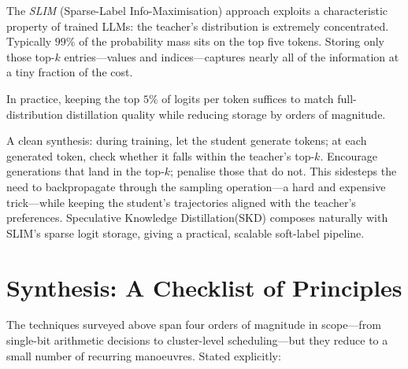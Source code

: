 \documentclass[11pt,a4paper]{article}
\theoremstyle{definition}
\theoremstyle{remark}
\theoremstyle{plain}
\begin{document}
The \emph{SLIM} (Sparse-Label Info-Maximisation) approach exploits a
characteristic property of trained LLMs: the teacher's distribution is
extremely concentrated. Typically $99\%$ of the probability mass sits on
the top five tokens. Storing only those top-$k$ entries---values and
indices---captures nearly all of the information at a tiny fraction of the
cost.

In practice, keeping the top $5\%$ of logits per token suffices to match
full-distribution distillation quality while reducing storage by orders of
magnitude.

A clean synthesis: during training, let the student generate tokens; at
each generated token, check whether it falls within the teacher's top-$k$.
Encourage generations that land in the top-$k$; penalise those that do
not. This sidesteps the need to backpropagate through the sampling
operation---a hard and expensive trick---while keeping the student's
trajectories aligned with the teacher's preferences. Speculative Knowledge Distillation(SKD) composes
naturally with SLIM's sparse logit storage, giving a practical, scalable
soft-label pipeline.

\section{Synthesis: A Checklist of Principles}
\label{sec:close}

The techniques surveyed above span four orders of magnitude in
scope---from single-bit arithmetic decisions to cluster-level
scheduling---but they reduce to a small number of recurring manoeuvres.
Stated explicitly:
\end{document}
